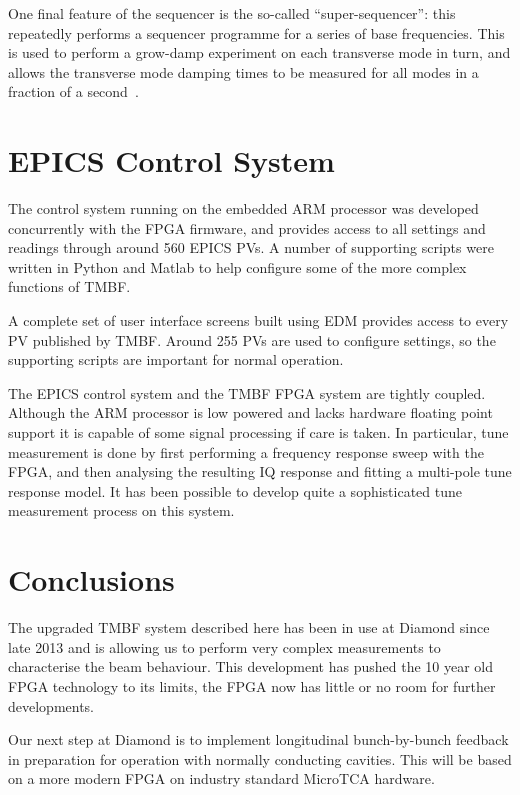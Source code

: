 \documentclass{jacow}
\begin{document}
One final feature of the sequencer is the so-called ``super-sequencer'': this
repeatedly performs a sequencer programme for a series of base frequencies.
This is used to perform a grow-damp experiment on each transverse mode in turn,
and allows the transverse mode damping times to be measured for all modes in a
fraction of a second~\cite{ibic2014}.


\section{EPICS Control System}

The control system running on the embedded ARM processor was developed
concurrently with the FPGA firmware, and provides access to all settings and
readings through around 560 EPICS PVs.  A number of supporting scripts were
written in Python and Matlab to help configure some of the more complex
functions of TMBF.

A complete set of user interface screens built using EDM provides access to
every PV published by TMBF.  Around 255 PVs are used to configure settings, so
the supporting scripts are important for normal operation.

The EPICS control system and the TMBF FPGA system are tightly coupled.  Although
the ARM processor is low powered and lacks hardware floating point support it is
capable of some signal processing if care is taken.  In particular, tune
measurement is done by first performing a frequency response sweep with the
FPGA, and then analysing the resulting IQ response and fitting a multi-pole tune
response model.  It has been possible to develop quite a sophisticated tune
measurement process on this system.


\section{Conclusions}

The upgraded TMBF system described here has been in use at Diamond since late
2013 and is allowing us to perform very complex measurements to characterise the
beam behaviour.  This development has pushed the 10 year old FPGA technology to
its limits, the FPGA now has little or no room for further developments.

Our next step at Diamond is to implement longitudinal bunch-by-bunch feedback in
preparation for operation with normally conducting cavities.  This will be based
on a more modern FPGA on industry standard MicroTCA hardware.
\end{document}
